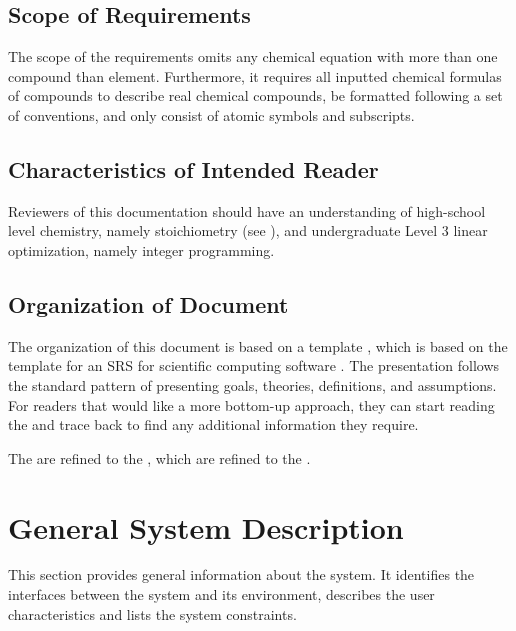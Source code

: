 \documentclass[12pt]{article}
\begin{document}
\subsection{Scope of Requirements} \label{sec_scope}

The scope of the requirements omits any chemical equation with more than one
compound than element. Furthermore, it requires all inputted chemical formulas
of compounds to describe real chemical compounds, be formatted following a set
of conventions, and only consist of atomic symbols and subscripts.

\newpage

\subsection{Characteristics of Intended Reader} \label{sec_IntendedReader}
Reviewers of this documentation should have an understanding of high-school
level chemistry, namely stoichiometry (see ), and
undergraduate Level 3 linear optimization, namely integer programming.

\subsection{Organization of Document}
The organization of this document is based on a template
\cite{smith_captemplate_2022}, which is based on the template for an SRS for
scientific computing software \cite{SmithAndLai2005}
\cite{SmithEtAl2007} \cite{koothoor_document_2013}. The presentation
follows the standard pattern of presenting goals, theories, definitions, and
assumptions. For readers that would like a more bottom-up approach, they can
start reading the  and trace back to find any additional
information they require.

The  are refined to the , which are
refined to the .

\section{General System Description} \label{sec_genSysDesc}

This section provides general information about the system.  It identifies the
interfaces between the system and its environment, describes the user
characteristics and lists the system constraints.
\end{document}

